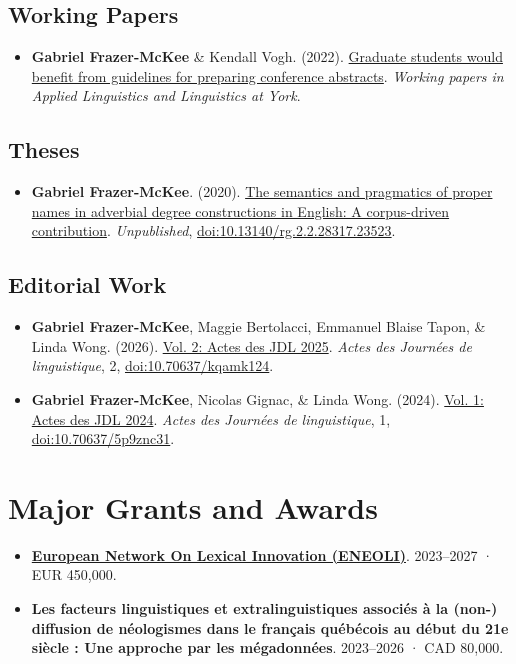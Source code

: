 \documentclass[
  canadian,
  10pt,
  letterpaper,
]{article}
\providecommand{\tightlist}{%
  \setlength{\itemsep}{0pt}\setlength{\parskip}{0pt}}
\begin{document}
\subsection{Working Papers}\label{working-papers}

\begin{itemize}
\tightlist
\item
  \textbf{Gabriel Frazer-McKee} \& Kendall Vogh. (2022).
  \href{https://wally.journals.yorku.ca/index.php/default/article/view/19}{Graduate
  students would benefit from guidelines for preparing conference
  abstracts}. \emph{Working papers in Applied Linguistics and
  Linguistics at York}.
\end{itemize}

\subsection{Theses}\label{theses}

\begin{itemize}
\tightlist
\item
  \textbf{Gabriel Frazer-McKee}. (2020).
  \href{https://doi.org/10.13140/rg.2.2.28317.23523}{The semantics and
  pragmatics of proper names in adverbial degree constructions in
  English: A corpus-driven contribution}. \emph{Unpublished},
  \href{https://doi.org/10.13140/rg.2.2.28317.23523}{doi:10.13140/rg.2.2.28317.23523}.
\end{itemize}

\subsection{Editorial Work}\label{editorial-work}

\begin{itemize}
\tightlist
\item
  \textbf{Gabriel Frazer-McKee}, Maggie Bertolacci, Emmanuel Blaise
  Tapon, \& Linda Wong. (2026).
  \href{https://doi.org/10.70637/kqamk124}{Vol. 2: Actes des JDL 2025}.
  \emph{Actes des Journées de linguistique}, 2,
  \href{https://doi.org/10.70637/kqamk124}{doi:10.70637/kqamk124}.
\item
  \textbf{Gabriel Frazer-McKee}, Nicolas Gignac, \& Linda Wong. (2024).
  \href{https://doi.org/10.70637/5p9znc31}{Vol. 1: Actes des JDL 2024}.
  \emph{Actes des Journées de linguistique}, 1,
  \href{https://doi.org/10.70637/5p9znc31}{doi:10.70637/5p9znc31}.
\end{itemize}

\section{Major Grants and Awards}\label{major-grants-and-awards}

\begin{itemize}
\tightlist
\item
  \textbf{\href{http://www.eneoli.eu}{European Network On Lexical
  Innovation (ENEOLI)}}. 2023--2027 · EUR 450,000.
\item
  \textbf{Les facteurs linguistiques et extralinguistiques associés à la
  (non-) diffusion de néologismes dans le français québécois au début du
  21e siècle : Une approche par les mégadonnées}. 2023--2026 · CAD
  80,000.
\end{itemize}
\end{document}
